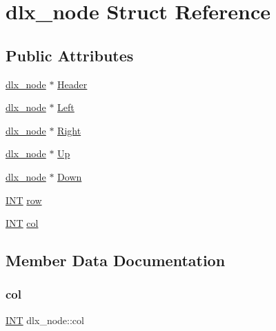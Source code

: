 \hypertarget{structdlx__node}{}\section{dlx\+\_\+node Struct Reference}
\label{structdlx__node}
\subsection*{Public Attributes}
\begin{DoxyCompactItemize}
\item 
\mbox{\hyperlink{structdlx__node}{dlx\+\_\+node}} $\ast$ \mbox{\hyperlink{structdlx__node_ac6ef0c65b9a285f59908ce8e55d38a47}{Header}}
\item 
\mbox{\hyperlink{structdlx__node}{dlx\+\_\+node}} $\ast$ \mbox{\hyperlink{structdlx__node_abdec7633aa02d6ed5efd4d3ebe551504}{Left}}
\item 
\mbox{\hyperlink{structdlx__node}{dlx\+\_\+node}} $\ast$ \mbox{\hyperlink{structdlx__node_aece31234b8ca7ebd37ebf3aa7e8989b1}{Right}}
\item 
\mbox{\hyperlink{structdlx__node}{dlx\+\_\+node}} $\ast$ \mbox{\hyperlink{structdlx__node_a9093c5ee407cbfc878291ee64b72f530}{Up}}
\item 
\mbox{\hyperlink{structdlx__node}{dlx\+\_\+node}} $\ast$ \mbox{\hyperlink{structdlx__node_afcaa82d7c93179f21371aec2f009b1bf}{Down}}
\item 
\mbox{\hyperlink{galois_8h_a09fddde158a3a20bd2dcadb609de11dc}{I\+NT}} \mbox{\hyperlink{structdlx__node_a0b0ef03c03d032dcab7e18b25fd01baf}{row}}
\item 
\mbox{\hyperlink{galois_8h_a09fddde158a3a20bd2dcadb609de11dc}{I\+NT}} \mbox{\hyperlink{structdlx__node_a3fb106557e166405b0f98f5c9da4d7f1}{col}}
\end{DoxyCompactItemize}


\subsection{Member Data Documentation}
\mbox{\label{structdlx__node_a3fb106557e166405b0f98f5c9da4d7f1}} 
\subsubsection{\texorpdfstring{col}{col}}
{\footnotesize\ttfamily \mbox{\hyperlink{galois_8h_a09fddde158a3a20bd2dcadb609de11dc}{I\+NT}} dlx\+\_\+node\+::col}

